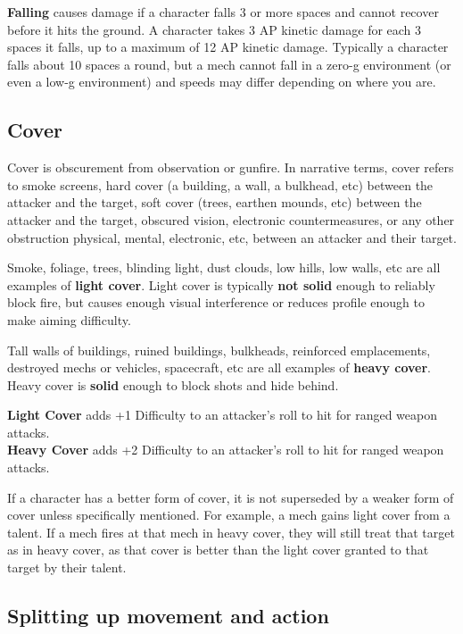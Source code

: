 \textbf{Falling} causes damage if a character falls 3 or more spaces and cannot recover before it hits the ground. A character takes 3 AP kinetic damage for each 3 spaces it falls, up to a maximum of 12 AP kinetic damage. Typically a character falls about 10 spaces a round, but a mech cannot fall in a zero-g environment (or even a low-g environment) and speeds may differ depending on where you are.

\subsection{Cover}

Cover is obscurement from observation or gunfire. In narrative terms, cover refers to smoke screens, hard cover (a building, a wall, a bulkhead, etc) between the attacker and the target, soft cover (trees, earthen mounds, etc) between the attacker and the target, obscured vision, electronic countermeasures, or any other obstruction physical, mental, electronic, etc, between an attacker and their target.

Smoke, foliage, trees, blinding light, dust clouds, low hills, low walls, etc are all examples of \textbf{light cover}. Light cover is typically \textbf{not solid} enough to reliably block fire, but causes enough visual interference or reduces profile enough to make aiming difficulty.

Tall walls of buildings, ruined buildings, bulkheads, reinforced emplacements, destroyed mechs or vehicles, spacecraft, etc are all examples of \textbf{heavy cover}. Heavy cover is \textbf{solid} enough to block shots and hide behind.

\textbf{Light Cover} adds +1 Difficulty to an attacker’s roll to hit for ranged weapon attacks.\\
\textbf{Heavy Cover} adds +2 Difficulty to an attacker’s roll to hit for ranged weapon attacks.

If a character has a better form of cover, it is not superseded by a weaker form of cover unless specifically mentioned. For example, a mech gains light cover from a talent. If a mech fires at that mech in heavy cover, they will still treat that target as in heavy cover, as that cover is better than the light cover granted to that target by their talent.


\subsection{Splitting up movement and action}

